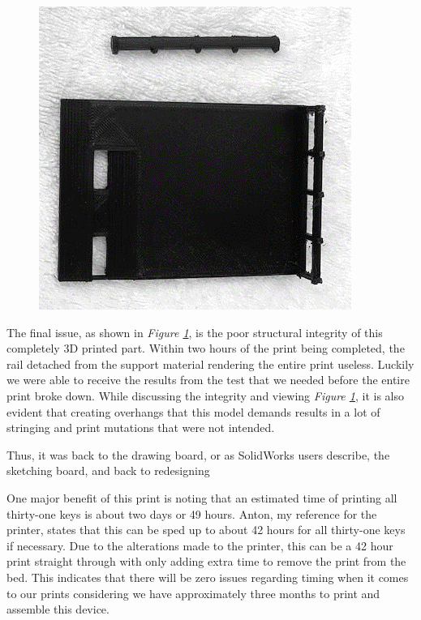 \begin{figure}[h!]
  \centering
  \includegraphics[width=0.8\linewidth]{image/Print4.png}
  \caption{}
  \label{fig:print4}
\end{figure}

The final issue, as shown in \textit{Figure \ref{fig:print4}}, is the poor structural integrity of this completely 3D printed part. Within two hours of the print being completed, the rail detached from the support material rendering the entire print useless. Luckily we were able to receive the results from the test that we needed before the entire print broke down. While discussing the integrity and viewing \textit{Figure \ref{fig:print4}}, it is also evident that creating overhangs that this model demands results in a lot of stringing and print mutations that were not intended.

Thus, it was back to the drawing board, or as SolidWorks users describe, the sketching board, and back to redesigning

One major benefit of this print is noting that an estimated time of printing all thirty-one keys is about two days or 49 hours. Anton, my reference for the printer, states that this can be sped up to about 42 hours for all thirty-one keys if necessary. Due to the alterations made to the printer, this can be a 42 hour print straight through with only adding extra time to remove the print from the bed. This indicates that there will be zero issues regarding timing when it comes to our prints considering we have approximately three months to print and assemble this device.

